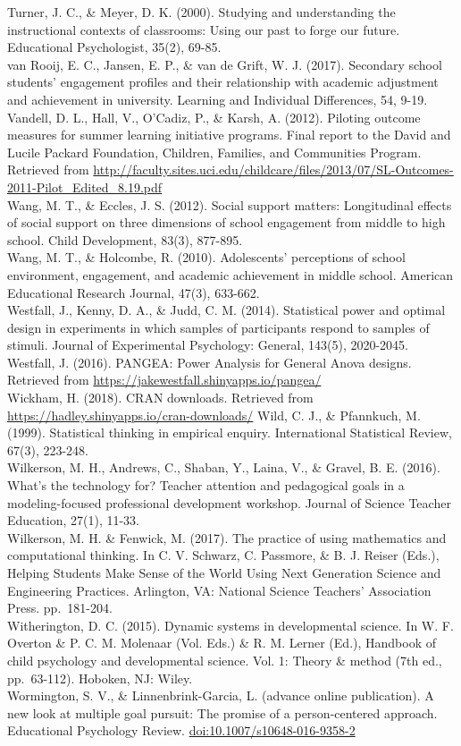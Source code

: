 \documentclass[]{msu-thesis}
\theoremstyle{definition}
\theoremstyle{definition}
\theoremstyle{definition}
\theoremstyle{remark}
\begin{document}
Turner, J. C., \& Meyer, D. K. (2000). Studying and understanding the
instructional contexts of classrooms: Using our past to forge our
future. Educational Psychologist, 35(2), 69-85.\\
van Rooij, E. C., Jansen, E. P., \& van de Grift, W. J. (2017).
Secondary school students' engagement profiles and their relationship
with academic adjustment and achievement in university. Learning and
Individual Differences, 54, 9-19.\\
Vandell, D. L., Hall, V., O'Cadiz, P., \& Karsh, A. (2012). Piloting
outcome measures for summer learning initiative programs. Final report
to the David and Lucile Packard Foundation, Children, Families, and
Communities Program. Retrieved from
\url{http://faculty.sites.uci.edu/childcare/files/2013/07/SL-Outcomes-2011-Pilot_Edited_8.19.pdf}\\
Wang, M. T., \& Eccles, J. S. (2012). Social support matters:
Longitudinal effects of social support on three dimensions of school
engagement from middle to high school. Child Development, 83(3),
877-895.\\
Wang, M. T., \& Holcombe, R. (2010). Adolescents' perceptions of school
environment, engagement, and academic achievement in middle school.
American Educational Research Journal, 47(3), 633-662.\\
Westfall, J., Kenny, D. A., \& Judd, C. M. (2014). Statistical power and
optimal design in experiments in which samples of participants respond
to samples of stimuli. Journal of Experimental Psychology: General,
143(5), 2020-2045.\\
Westfall, J. (2016). PANGEA: Power Analysis for General Anova designs.
Retrieved from \url{https://jakewestfall.shinyapps.io/pangea/}\\
Wickham, H. (2018). CRAN downloads. Retrieved from
\url{https://hadley.shinyapps.io/cran-downloads/} Wild, C. J., \&
Pfannkuch, M. (1999). Statistical thinking in empirical enquiry.
International Statistical Review, 67(3), 223-248.\\
Wilkerson, M. H., Andrews, C., Shaban, Y., Laina, V., \& Gravel, B. E.
(2016). What's the technology for? Teacher attention and pedagogical
goals in a modeling-focused professional development workshop. Journal
of Science Teacher Education, 27(1), 11-33.\\
Wilkerson, M. H. \& Fenwick, M. (2017). The practice of using
mathematics and computational thinking. In C. V. Schwarz, C. Passmore,
\& B. J. Reiser (Eds.), Helping Students Make Sense of the World Using
Next Generation Science and Engineering Practices. Arlington, VA:
National Science Teachers' Association Press. pp.~181-204.\\
Witherington, D. C. (2015). Dynamic systems in developmental science. In
W. F. Overton \& P. C. M. Molenaar (Vol. Eds.) \& R. M. Lerner (Ed.),
Handbook of child psychology and developmental science. Vol. 1: Theory
\& method (7th ed., pp.~63-112). Hoboken, NJ: Wiley.\\
Wormington, S. V., \& Linnenbrink-Garcia, L. (advance online
publication). A new look at multiple goal pursuit: The promise of a
person-centered approach. Educational Psychology Review.
\url{doi:10.1007/s10648-016-9358-2}
\end{document}
